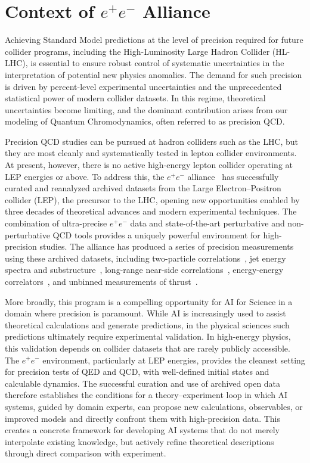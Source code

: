 \section{Context of $e^+e^-$ Alliance}
\label{sec:context}

Achieving Standard Model predictions at the level of precision required for future collider programs, including the High-Luminosity Large Hadron Collider (HL-LHC), is essential to ensure robust control of systematic uncertainties in the interpretation of potential new physics anomalies. The demand for such precision is driven by percent-level experimental uncertainties and the unprecedented statistical power of modern collider datasets. In this regime, theoretical uncertainties become limiting, and the dominant contribution arises from our modeling of Quantum Chromodynamics, often referred to as precision QCD.

Precision QCD studies can be pursued at hadron colliders such as the LHC, but they are most cleanly and systematically tested in lepton collider environments. At present, however, there is no active high-energy lepton collider operating at LEP energies or above. To address this, the $e^+e^-$ alliance~\cite{EEAlliance:website} has successfully curated and reanalyzed archived datasets from the Large Electron--Positron collider (LEP), the precursor to the LHC, opening new opportunities enabled by three decades of theoretical advances and modern experimental techniques. The combination of ultra-precise $e^+e^-$ data and state-of-the-art perturbative and non-perturbative QCD tools provides a uniquely powerful environment for high-precision studies. The alliance has produced a series of precision measurements using these archived datasets, including two-particle correlations~\cite{Badea:2019vey}, jet energy spectra and substructure~\cite{Chen:2021uws}, long-range near-side correlations~\cite{Chen:2024lrc}, energy-energy correlators~\cite{Bossi:2025eec}, and unbinned measurements of thrust~\cite{Badea:2025ubt}.

More broadly, this program is a compelling opportunity for AI for Science in a domain where precision is paramount. While AI is increasingly used to assist theoretical calculations and generate predictions, in the physical sciences such predictions ultimately require experimental validation. In high-energy physics, this validation depends on collider datasets that are rarely publicly accessible. The $e^+e^-$ environment, particularly at LEP energies, provides the cleanest setting for precision tests of QED and QCD, with well-defined initial states and calculable dynamics. The successful curation and use of archived open data therefore establishes the conditions for a theory--experiment loop in which AI systems, guided by domain experts, can propose new calculations, observables, or improved models and directly confront them with high-precision data. This creates a concrete framework for developing AI systems that do not merely interpolate existing knowledge, but actively refine theoretical descriptions through direct comparison with experiment.

